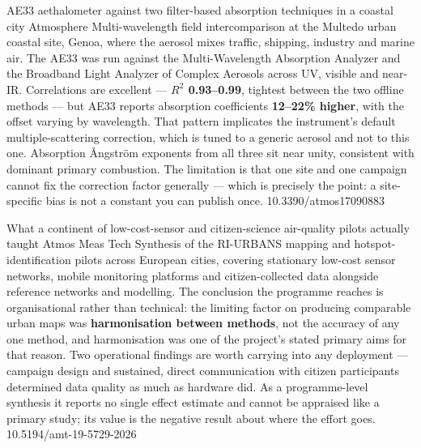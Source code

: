 \documentclass[10pt]{article}
\begin{document}
{AE33 aethalometer against two filter-based absorption techniques in a coastal city}
{Atmosphere}
{Multi-wavelength field intercomparison at the Multedo urban coastal site, Genoa, where the
aerosol mixes traffic, shipping, industry and marine air. The AE33 was run against the
Multi-Wavelength Absorption Analyzer and the Broadband Light Analyzer of Complex Aerosols
across UV, visible and near-IR. Correlations are excellent --- \textbf{$R^2$ 0.93--0.99},
tightest between the two offline methods --- but AE33 reports absorption coefficients
\textbf{12--22\% higher}, with the offset varying by wavelength. That pattern implicates
the instrument's default multiple-scattering correction, which is tuned to a generic
aerosol and not to this one. Absorption Ångström exponents from all three sit near unity,
consistent with dominant primary combustion. The limitation is that one site and one
campaign cannot fix the correction factor generally --- which is precisely the point:
a site-specific bias is not a constant you can publish once.}
{10.3390/atmos17090883}

{What a continent of low-cost-sensor and citizen-science air-quality pilots actually taught}
{Atmos Meas Tech}
{Synthesis of the RI-URBANS mapping and hotspot-identification pilots across European
cities, covering stationary low-cost sensor networks, mobile monitoring platforms and
citizen-collected data alongside reference networks and modelling. The conclusion the
programme reaches is organisational rather than technical: the limiting factor on
producing comparable urban maps was \textbf{harmonisation between methods}, not the
accuracy of any one method, and harmonisation was one of the project's stated primary
aims for that reason. Two operational findings are worth carrying into any deployment ---
campaign design and sustained, direct communication with citizen participants determined
data quality as much as hardware did. As a programme-level synthesis it reports no single
effect estimate and cannot be appraised like a primary study; its value is the negative
result about where the effort goes.}
{10.5194/amt-19-5729-2026}
\end{document}
